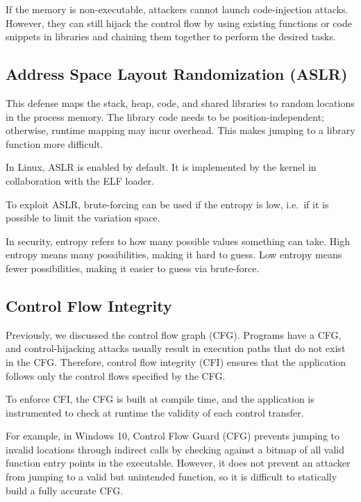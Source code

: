 If the memory is non-executable, attackers cannot launch code-injection attacks. However, they can still hijack the control flow by using existing functions or code snippets in libraries and chaining them together to perform the desired tasks.

\subsection{Address Space Layout Randomization (ASLR)}

This defense maps the stack, heap, code, and shared libraries to random locations in the process memory. The library code needs to be position-independent; otherwise, runtime mapping may incur overhead. This makes jumping to a library function more difficult.

In Linux, ASLR is enabled by default. It is implemented by the kernel in collaboration with the ELF loader.

To exploit ASLR, brute-forcing can be used if the entropy is low, i.e.\ if it is possible to limit the variation space.

\begin{remark}
  In security, entropy refers to how many possible values something can take. High entropy means many possibilities, making it hard to guess. Low entropy means fewer possibilities, making it easier to guess via brute-force.
\end{remark}

\subsection{Control Flow Integrity}

Previously, we discussed the control flow graph (CFG). Programs have a CFG, and control-hijacking attacks usually result in execution paths that do not exist in the CFG. Therefore, control flow integrity (CFI) ensures that the application follows only the control flows specified by the CFG.

To enforce CFI, the CFG is built at compile time, and the application is instrumented to check at runtime the validity of each control transfer.

For example, in Windows 10, Control Flow Guard (CFG) prevents jumping to invalid locations through indirect calls by checking against a bitmap of all valid function entry points in the executable. However, it does not prevent an attacker from jumping to a valid but unintended function, so it is difficult to statically build a fully accurate CFG.
